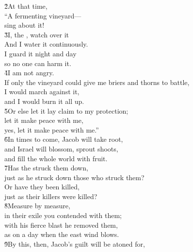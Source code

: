 \begin{poetry}
\poeml \v{2}At that time, \\
\poemll    ``A fermenting vineyard--- \\
\poemlll       sing about it! \\
\poeml \v{3}I, the , watch over it \\
\poemll    And I water it continuously. \\
\poeml I guard it night and day \\
\poemll    so no one can harm it. \\
\poeml \v{4}I am not angry. \\
\poemll    If only the vineyard could give me briers and thorns to battle, \\
\poeml I would march against it, \\
\poemll    and I would burn it all up. \\
\poeml \v{5}Or else let it lay claim to my protection; \\
\poemll    let it make peace with me, \\
\poemlll       yes, let it make peace with me.'' \\
\poeml \v{6}In times to come, Jacob will take root, \\
\poemll    and Israel will blossom, sprout shoots, \\
\poemlll       and fill the whole world with fruit. \\
\poeml \v{7}Has the  struck them down, \\
\poemll    just as he struck down those who struck them? \\
\poeml Or have they been killed, \\
\poemll    just as their killers were killed? \\
\poeml \v{8}Measure by measure, \\
\poemll    in their exile you contended with them; \\
\poeml with his fierce blast he removed them, \\
\poemll    as on a day when the east wind blows. \\
\poeml \v{9}By this, then, Jacob's guilt will be atoned for, \\

\end{poetry}
